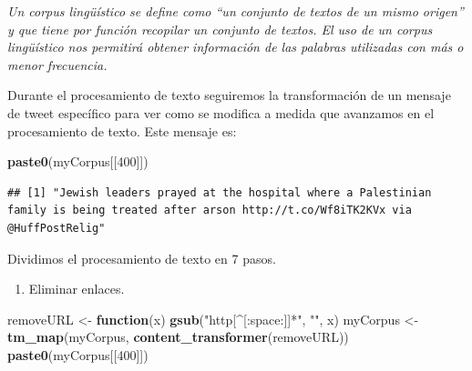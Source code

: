 \documentclass[
]{article}
\newenvironment{Shaded}{\begin{snugshade}}{\end{snugshade}}
\newcommand{\ControlFlowTok}[1]{\textcolor[rgb]{0.13,0.29,0.53}{\textbf{#1}}}
\newcommand{\DecValTok}[1]{\textcolor[rgb]{0.00,0.00,0.81}{#1}}
\newcommand{\KeywordTok}[1]{\textcolor[rgb]{0.13,0.29,0.53}{\textbf{#1}}}
\newcommand{\NormalTok}[1]{#1}
\newcommand{\OperatorTok}[1]{\textcolor[rgb]{0.81,0.36,0.00}{\textbf{#1}}}
\newcommand{\StringTok}[1]{\textcolor[rgb]{0.31,0.60,0.02}{#1}}
\providecommand{\tightlist}{%
  \setlength{\itemsep}{0pt}\setlength{\parskip}{0pt}}
\begin{document}
\emph{Un corpus lingüístico se define como ``un conjunto de textos de un
mismo origen'' y que tiene por función recopilar un conjunto de textos.
El uso de un corpus lingüístico nos permitirá obtener información de las
palabras utilizadas con más o menor frecuencia.}

\begin{Shaded}
\end{Shaded}

Durante el procesamiento de texto seguiremos la transformación de un
mensaje de tweet específico para ver como se modifica a medida que
avanzamos en el procesamiento de texto. Este mensaje es:

\begin{Shaded}
\begin{Highlighting}[]
\KeywordTok{paste0}\NormalTok{(myCorpus[[}\DecValTok{400}\NormalTok{]])}
\end{Highlighting}
\end{Shaded}

\begin{verbatim}
## [1] "Jewish leaders prayed at the hospital where a Palestinian family is being treated after arson http://t.co/Wf8iTK2KVx via @HuffPostRelig"
\end{verbatim}

Dividimos el procesamiento de texto en 7 pasos.

\begin{enumerate}
\def\labelenumi{\arabic{enumi}.}
\tightlist
\item
  Eliminar enlaces.
\end{enumerate}

\begin{Shaded}
\begin{Highlighting}[]
\NormalTok{removeURL <-}\StringTok{ }\ControlFlowTok{function}\NormalTok{(x) }\KeywordTok{gsub}\NormalTok{(}\StringTok{"http[^[:space:]]*"}\NormalTok{, }\StringTok{""}\NormalTok{, x)  }
\NormalTok{myCorpus <-}\StringTok{ }\KeywordTok{tm_map}\NormalTok{(myCorpus, }\KeywordTok{content_transformer}\NormalTok{(removeURL))}
\KeywordTok{paste0}\NormalTok{(myCorpus[[}\DecValTok{400}\NormalTok{]])}
\end{Highlighting}
\end{Shaded}
\end{document}
